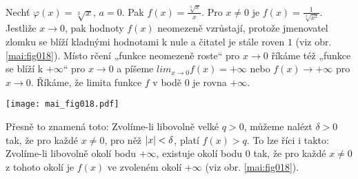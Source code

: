 \begin{mdframed}[style=mdexam]
  \begin{example}\label{MAI:exam029}
  Nechť \(\varphi(x) = \sqrt[3]{x}\), \(a = 0\). Pak \(f(x) = \frac{\sqrt[3]{x}}{x}\). Pro \(x \neq
  0\) je \(f(x) = \frac{1}{\sqrt[3]{x^2}}\). Jestliže \(x \to 0\), pak hodnoty \(f(x)\) neomezeně
  vzrůstají, protože jmenovatel zlomku se blíží kladnými hodnotami k nule a čitatel je stále roven
  \(1\) (viz obr. \ref{mai:fig018}). Místo rčení „funkce neomezeně roste“ pro \(x \to 0\) říkáme též
  „funkce se blíží k \(+\infty\)“ pro \(x \to 0\) a píšeme \(lim_{x\to 0} f(x) = +\infty\) nebo
  \(f(x) \to +\infty\) pro \(x \to 0\). Říkáme, že limita funkce \(f\) v bodě \(0\) je rovna
  \(+\infty\). 
    
    {\centering
    \captionsetup{type=figure}
    \texttt{[image: mai\_fig018.pdf]}
    \par}
    
    Přesně to znamená toto: Zvolíme-li libovolně velké \(q > 0\), můžeme nalézt \(\delta > 0\) tak,
    že pro každé \(x \neq 0\), pro něž \(\left\lvert x\right\rvert < \delta\), platí \(f(x) > q\). To lze říci i
    takto: Zvolíme-li libovolně okolí bodu \(+\infty\), existuje okolí bodu \(0\) tak, že pro každé
    \(x \neq 0\) z tohoto okolí je \(f(x)\) ve zvoleném okolí \(+\infty\) (viz obr.
    \ref{mai:fig018}).
  \end{example}
\end{mdframed}















